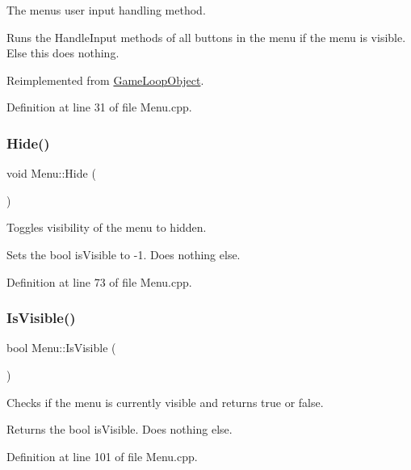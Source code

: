 The menu\textquotesingle{}s user input handling method. 

Runs the Handle\+Input methods of all buttons in the menu if the menu is visible. Else this does nothing. 

Reimplemented from \hyperlink{class_game_loop_object_aecab111d504b7f4590045ca7c83a36de}{Game\+Loop\+Object}.



Definition at line 31 of file Menu.\+cpp.

\mbox{\label{class_menu_a5e035344163bc1d000a4e519181b2688}} 
\subsubsection{\texorpdfstring{Hide()}{Hide()}}
{\footnotesize\ttfamily void Menu\+::\+Hide (\begin{DoxyParamCaption}{ }\end{DoxyParamCaption})}



Toggles visibility of the menu to hidden. 

Sets the bool is\+Visible to -\/1. Does nothing else. 

Definition at line 73 of file Menu.\+cpp.

\mbox{\label{class_menu_a960228ac37c0f68984e3eac976f63d61}} 
\subsubsection{\texorpdfstring{Is\+Visible()}{IsVisible()}}
{\footnotesize\ttfamily bool Menu\+::\+Is\+Visible (\begin{DoxyParamCaption}{ }\end{DoxyParamCaption})}



Checks if the menu is currently visible and returns true or false. 

Returns the bool is\+Visible. Does nothing else. 

Definition at line 101 of file Menu.\+cpp.

\mbox{\label{class_menu_aa1c57bdd5d83521af8214ac43a68d878}} 

